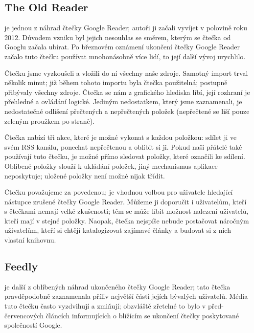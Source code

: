 \subsection{The Old Reader}

 je jednou z náhrad čtečky Google Reader; autoři ji začali vyvíjet v polovině roku 2012.
Důvodem vzniku byl jejich nesouhlas se směrem, kterým se čtečka od Googlu začala ubírat.
Po březnovém oznámení ukončení čtečky Google Reader začalo tuto čtečku používat mnohonásobně více lidí, to její další vývoj urychlilo.

Čtečku jsme vyzkoušeli a vložili do ní všechny naše zdroje.
Samotný import trval několik minut; již během tohoto importu byla čtečka použitelná; postupně přibývaly všechny zdroje.
Čtečka se nám z grafického hlediska líbí, její rozhraní je přehledné a ovládání logické.
Jediným nedostatkem, který jsme zaznamenali, je nedostatečné odlišení přečtených a nepřečtených položek (nepřečtené se liší pouze zeleným proužkem po straně).

Čtečka nabízí tři akce, které je možné vykonat s každou položkou: sdílet ji ve svém RSS kanálu, ponechat nepřečtenou a oblíbit si ji.
Pokud naši přátelé také používají tuto čtečku, je možné přímo sledovat položky, které označili ke sdílení.
Oblíbené položky slouží k ukládání položek, jiný mechanismus aplikace neposkytuje; uložené položky není možné nijak třídit.

Čtečku považujeme za povedenou; je vhodnou volbou pro uživatele hledající nástupce zrušené čtečky Google Reader.
Můžeme ji doporučit i uživatelům, kteří s čtečkami nemají velké zkušenosti; těm se může líbit možnost nalezení uživatelů, kteří mají v  stejné položky.
Naopak, čtečka nejspíše nebude postačovat náročným uživatelům, kteří si chtějí katalogizovat zajímavé články a budovat si z nich vlastní knihovnu.

\subsection{Feedly}

 je další z oblíbených náhrad ukončeného čtečky Google Reader; tato čtečka pravděpodobně zaznamenala příliv největší části jejích bývalých uživatelů.
Média tuto čtečku často vyzdvihují a zmiňují; obzvláště zřetelné to bylo v před-červencových článcích informujících o blížícím se ukončení čtečky poskytované společností Google.

